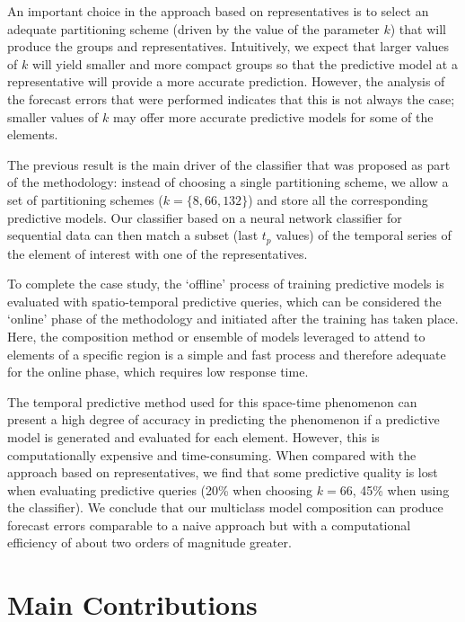 An important choice in the approach based on representatives is to select an adequate partitioning scheme (driven by the value of the parameter $k$) that will produce the groups and representatives. Intuitively, we expect that larger values of $k$ will yield smaller and more compact groups so that the predictive model at a representative will provide a more accurate prediction. However, the analysis of the forecast errors that were performed indicates that this is not always the case; smaller values of $k$ may offer more accurate predictive models for some of the elements.

The previous result is the main driver of the classifier that was proposed as part of the methodology: instead of choosing a single partitioning scheme, we allow a set of partitioning schemes ($k = \lbrace 8, 66, 132 \rbrace$) and store all the corresponding predictive models. Our classifier based on a neural network classifier for sequential data can then match a subset (last $t_p$ values) of the temporal series of the element of interest with one of the representatives.

To complete the case study, the `offline' process of training predictive models is evaluated with spatio-temporal predictive queries, which can be considered the `online' phase of the methodology and initiated after the training has taken place. Here, the composition method or ensemble of models leveraged to attend to elements of a specific region is a simple and fast process and therefore adequate for the online phase, which requires low response time.

The temporal predictive method used for this space-time phenomenon can present a high degree of accuracy in predicting the phenomenon if a predictive model is generated and evaluated for each element. However, this is computationally expensive and time-consuming. When compared with the approach based on representatives, we find that some predictive quality is lost when evaluating predictive queries (20\% when choosing $k=66$, 45\% when using the classifier). We conclude that our multiclass model composition can produce forecast errors comparable to a naive approach but with a computational efficiency of about two orders of magnitude greater.

\section{Main Contributions}
\label{Sec:MainContributions}

